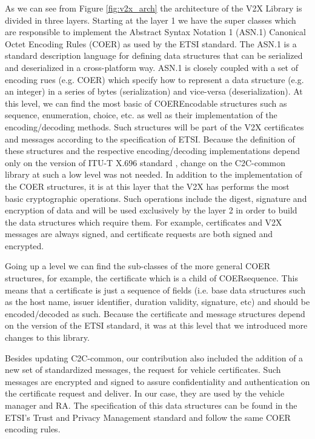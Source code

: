 As we can see from Figure \ref{fig:v2x_arch} the architecture of the V2X Library is divided in three layers. Starting at the layer 1 we have the super classes which are responsible to implement the Abstract Syntax Notation 1 (ASN.1) Canonical Octet Encoding Rules (COER) as used by the ETSI standard. The ASN.1 is a standard description language for defining data structures that can be serialized and deserialized in a cross-platform way. ASN.1 is closely coupled with a set of encoding rues (e.g. COER) which specify how to represent a data structure (e.g. an integer) in a series of bytes (serialization) and vice-versa (deserialization). At this level, we can find the most basic of COEREncodable structures such as sequence, enumeration, choice, etc. as well as their implementation of the encoding/decoding methods. Such structures will be part of the V2X certificates and messages according to the specification of ETSI. Because the definition of these structures and the respective encoding/decoding implementations depend only on the version of ITU-T X.696 standard \cite{coer_standard}, change on the C2C-common library at such a low level was not needed. In addition to the implementation of the COER structures, it is at this layer that the V2X has performs the most basic cryptographic operations. Such operations include the digest, signature and encryption of data and will be used exclusively by the layer 2 in order to build the data structures which require them. For example, certificates and V2X messages are always signed, and certificate requests are both signed and encrypted. 

Going up a level we can find the sub-classes of the more general COER structures, for example, the certificate which is a child of COERsequence. This means that a certificate is just a sequence of fields (i.e. base data structures such as the host name, issuer identifier, duration validity, signature, etc) and should be encoded/decoded as such. Because the certificate and message structures depend on the version of the ETSI standard, it was at this level that we introduced more changes to this library. 

Besides updating C2C-common, our contribution also included the addition of a new set of standardized messages, the request for vehicle certificates. Such messages are encrypted and signed to assure confidentiality and authentication on the certificate request and deliver. In our case, they are used by the vehicle manager and RA. The specification of this data structures can be found in the ETSI's Trust and Privacy Management standard \cite{etsi_privacy} and follow the same COER encoding rules. 

